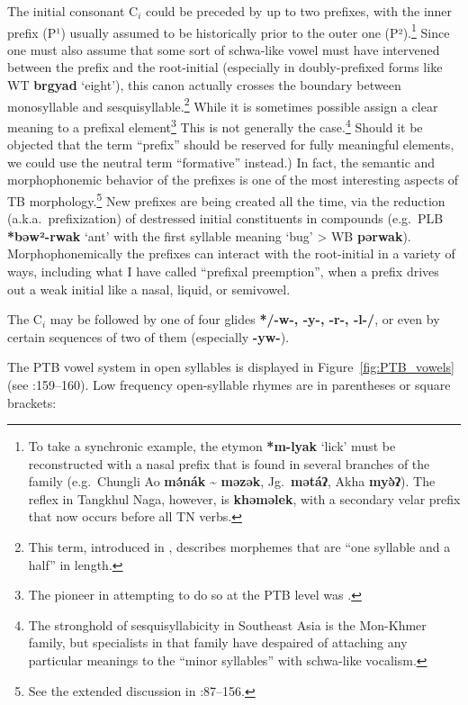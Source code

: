 The initial consonant $\textrm{C}_i$ could be preceded by up to two prefixes, with the inner prefix (P¹) usually assumed to be historically prior to the outer one (P²).\footnote{To take a synchronic example, the etymon \textbf{*m-lyak} ‘lick’ must be reconstructed with a nasal prefix that is found in several branches of the family (e.g.\ Chungli Ao \textbf{mə́nák} \textasciitilde{} \textbf{məzək}, Jg.~\textbf{mətáʔ}, Akha \textbf{myə̀ʔ}). The reflex in Tangkhul Naga, however, is \textbf{khəməlek}, with a secondary velar prefix that now occurs before all TN verbs.}
Since one must also assume that some sort of schwa-like vowel must have intervened between the prefix and the root-initial (especially in doubly-prefixed forms like WT \textbf{brgyad} ‘eight’), this canon actually crosses the boundary between monosyllable and sesquisyllable.\footnote{This term, introduced in \citealt{JAM-TSEA}, describes morphemes that are “one syllable and a half” in length.} While it is sometimes possible assign a clear meaning to a prefixal element\footnote{The pioneer in attempting to do so at the PTB level was \citealt{WOL1929}.} This is not generally the case.\footnote{The stronghold of sesquisyllabicity in Southeast Asia is the Mon-Khmer family, but specialists in that family have despaired of attaching any particular meanings to the “minor syllables” with schwa-like vocalism.}  Should it be objected that the term “prefix” should be reserved for fully meaningful elements, we could use the neutral term “formative” instead.)
In fact, the semantic and morphophonemic behavior of the prefixes is one of the most interesting aspects of TB morphology.\footnote{See the extended discussion in \textit{}:87–156.} New prefixes are being created all the time, via the reduction (a.k.a.\ prefixization) of destressed initial constituents in compounds (e.g.\ PLB \textbf{*bəw²-rwak} ‘ant’ with the first syllable meaning ‘bug’ > WB \textbf{pərwak}). 
Morphophonemically the prefixes can interact with the root-initial in a variety of ways, including what I have called “prefixal preemption”, when a prefix drives out a weak initial like a nasal, liquid, or semivowel.

The $\textrm{C}_i$ may be followed by one of four glides \textbf{*/-w-, -y-, -r-, -l-/}, or even by certain sequences of two of them (especially \textbf{-yw-}).

The PTB vowel system in open syllables is displayed in Figure~\ref{fig:PTB_vowels} (see \textit{}:159–160). Low frequency open-syllable rhymes are in parentheses or square brackets:

